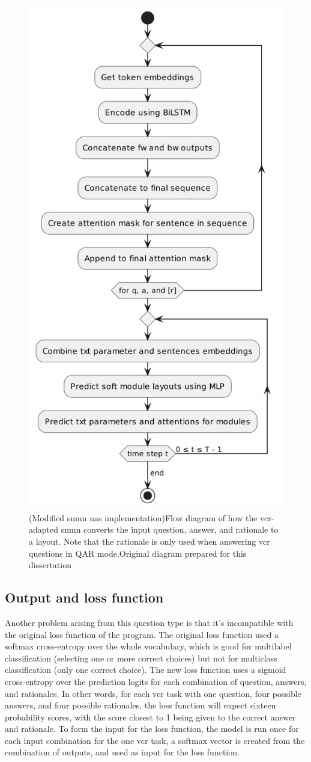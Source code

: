 \begin{figure}[htbp]
    \centering
    \includegraphics[width=.55\textwidth,keepaspectratio]{content/chapters/methodology/model_adaptation/figures/controller-layout-vcr-snmn.png}
    \captionsource(Modified \gls{snmn} \gls{nas} implementation){Flow diagram of how the \gls{vcr}-adapted \gls{snmn} converts the input question, answer, and rationale to a layout. Note that the rationale is only used when answering \gls{vcr} questions in QAR mode.\label{fig:vcr_snmn_input_unit}}{Original diagram prepared for this dissertation}
\end{figure}

\subsection{Output and loss function}
\label{subsec:output_and_loss_function}

Another problem arising from this question type is that it's incompatible with the original loss function of the program.
The original loss function used a softmax cross-entropy over the whole vocabulary, which is good for multilabel classification (selecting one or more correct choices) but not for multiclass classification (only one correct choice).
The new loss function uses a sigmoid cross-entropy over the prediction \glspl{logit} for each combination of question, answers, and rationales.
In other words, for each \gls{vcr} task with one question, four possible answers, and four possible rationales, the loss function will expect sixteen probability scores, with the score closest to 1 being given to the correct answer and rationale.
To form the input for the loss function, the model is run once for each input combination for the one \gls{vcr} task, a softmax vector is created from the combination of outputs, and used as input for the loss function.

